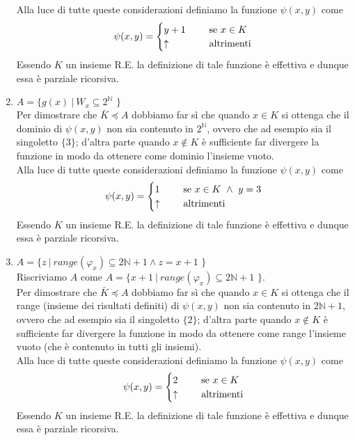 \documentclass[a4paper,oneside,titlepage]{book}
\begin{document}
\begin{enumerate}[label=\fbox{\arabic*}]
Alla luce di tutte queste considerazioni definiamo la funzione $\psi(x,y)$ come
\[
\psi(x,y) =
\begin{cases}
y+1& \hspace{0.5cm} \text{se } x \in K \\
\uparrow& \hspace{0.5cm} \text{altrimenti}
\end{cases}
\]
Essendo $K$ un insieme R.E. la definizione di tale funzione è effettiva e dunque essa è parziale ricorsiva.

\item $A = \text{\{ } g(x) \ | \ W_x \subseteq 2^{\mathbb{N}} \text{ \}}$
\\ Per dimostrare che $\bar{K} \preceq A$ dobbiamo far sì che quando $x \in K$ si ottenga che il dominio di $\psi(x,y)$ non sia contenuto in $2^{\mathbb{N}}$, ovvero che ad esempio sia il singoletto $\{3\}$; d'altra parte quando $x \notin K$ è sufficiente far divergere la funzione in modo da ottenere come dominio l'insieme vuoto.
\\ Alla luce di tutte queste considerazioni definiamo la funzione $\psi(x,y)$ come
\[
\psi(x,y) =
\begin{cases}
1& \hspace{0.5cm} \text{se } x \in K \ \wedge \ y=3 \\
\uparrow& \hspace{0.5cm} \text{altrimenti}
\end{cases}
\]
Essendo $K$ un insieme R.E. la definizione di tale funzione è effettiva e dunque essa è parziale ricorsiva.

\item $A = \text{\{ } z \ | \ range(\varphi_x) \subseteq 2\mathbb{N}+1 \wedge z=x+1 \text{ \}}$
\\ Riscriviamo $A$ come $A = \text{\{ } x+1 \ | \ range(\varphi_x) \subseteq 2\mathbb{N}+1 \text{ \}}$.
\\ Per dimostrare che $\bar{K} \preceq A$ dobbiamo far sì che quando $x \in K$ si ottenga che il range (insieme dei risultati definiti) di $\psi(x,y)$ non sia contenuto in $2\mathbb{N}+1$, ovvero che ad esempio sia il singoletto $\{2\}$; d'altra parte quando $x \notin K$ è sufficiente far divergere la funzione in modo da ottenere come range l'insieme vuoto (che è contenuto in tutti gli insiemi).
\\ Alla luce di tutte queste considerazioni definiamo la funzione $\psi(x,y)$ come
\[
\psi(x,y) =
\begin{cases}
2& \hspace{0.5cm} \text{se } x \in K \\
\uparrow& \hspace{0.5cm} \text{altrimenti}
\end{cases}
\]
Essendo $K$ un insieme R.E. la definizione di tale funzione è effettiva e dunque essa è parziale ricorsiva.


\end{enumerate}
\end{document}
